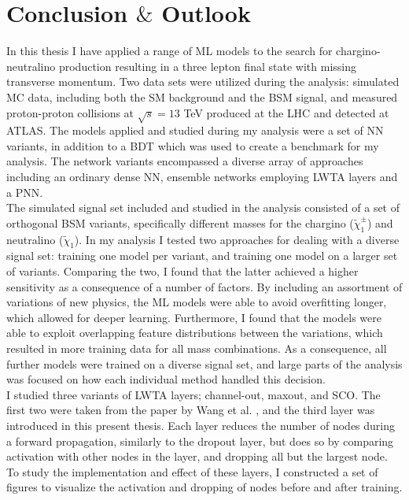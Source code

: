 \newpage
\chapter*{Conclusion $\&$ Outlook}
In this thesis I have applied a range of \ac{ML} models to the search for chargino-neutralino production resulting in 
a three lepton final state with missing transverse momentum. Two data sets were utilized during the analysis: simulated \ac{MC} data, including 
both the \ac{SM} background and the \ac{BSM} signal, and  measured proton-proton collisions at $\sqrt{s} = 13$ TeV produced at the \ac{LHC} and detected 
at \ac{ATLAS}. The models applied and studied during my analysis were a set of \ac{NN} variants, in addition to a \ac{BDT} which was used to 
create a benchmark for my analysis. The network variants encompassed a diverse array of approaches including an ordinary dense \ac{NN}, ensemble networks 
employing \ac{LWTA} layers and a \ac{PNN}.
\\\newline
The simulated signal set included and studied in the analysis consisted of a set of orthogonal \ac{BSM} variants, specifically different masses for the chargino ($\tilde{\chi}^\pm_1$) 
and neutralino ($\tilde{\chi}_1$). In my analysis I tested two approaches for dealing with a diverse signal set: training one model per variant, and training one model on a larger set 
of variants. Comparing the two, I found that the latter achieved a higher sensitivity as a consequence of a number of factors. By including an assortment of variations of new physics, 
the \ac{ML} models were able to avoid overfitting longer, which allowed for deeper learning. Furthermore, I found that the models were able to exploit overlapping feature distributions between 
the variations, which resulted in more training data for all mass combinations. As a consequence, all further models were trained on a diverse signal set, and large parts of the analysis 
was focused on how each individual method handled this decision.
\\\newline
I studied three variants of \ac{LWTA} layers; channel-out, maxout, and \ac{SCO}. The first two were taken from the paper by Wang et al. \cite{wang_maxout_2013}, and the third layer was introduced
in this present thesis. Each layer reduces the number of nodes during a forward propagation, similarly to the dropout layer, but does so by comparing activation with other nodes in the layer, and 
dropping all but the largest node. To study the implementation and effect of these layers, I constructed a set of figures to visualize the activation and dropping of nodes before and after training. 
